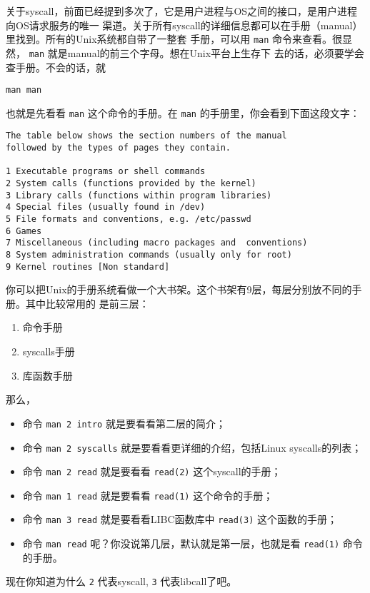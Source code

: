 \documentclass{wx672ctexart}
\newcommand\mpic[1]{%
  \marginpar{\texttt{[image: thumbnails/\#1]}}}
\begin{document}
\mpic{pg_0037}关于syscall，前面已经提到多次了，它是用户进程与OS之间的接口，是用户进程向OS请求服务的唯一
渠道。关于所有syscall的详细信息都可以在手册（manual）里找到。所有的Unix系统都自带了一整套
手册，可以用 \texttt{man} 命令来查看。很显然， \texttt{man} 就是manual的前三个字母。想在Unix平台上生存下
去的话，必须要学会查手册。不会的话，就
\begin{verbatim}
man man
\end{verbatim}
也就是先看看 \texttt{man} 这个命令的手册。在 \texttt{man} 的手册里，你会看到下面这段文字：

\begin{verbatim}
The table below shows the section numbers of the manual
followed by the types of pages they contain.

1 Executable programs or shell commands
2 System calls (functions provided by the kernel)
3 Library calls (functions within program libraries)
4 Special files (usually found in /dev)
5 File formats and conventions, e.g. /etc/passwd
6 Games
7 Miscellaneous (including macro packages and  conventions)
8 System administration commands (usually only for root)
9 Kernel routines [Non standard]
\end{verbatim}

你可以把Unix的手册系统看做一个大书架。这个书架有9层，每层分别放不同的手册。其中比较常用的
是前三层：
\begin{enumerate}
\item 命令手册
\item syscalls手册
\item 库函数手册
\end{enumerate}

那么，
\begin{itemize}
\item 命令 \texttt{man 2 intro} 就是要看看第二层的简介；
\item 命令 \texttt{man 2 syscalls} 就是要看看更详细的介绍，包括Linux syscalls的列表；
\item 命令 \texttt{man 2 read} 就是要看看 \texttt{read(2)} 这个syscall的手册；
\item 命令 \texttt{man 1 read} 就是要看看 \texttt{read(1)} 这个命令的手册；
\item 命令 \texttt{man 3 read} 就是要看看LIBC函数库中 \texttt{read(3)} 这个函数的手册；
\item 命令 \texttt{man read} 呢？你没说第几层，默认就是第一层，也就是看 \texttt{read(1)} 命令的手册。
\end{itemize}
现在你知道为什么 \texttt{2} 代表syscall, \texttt{3} 代表libcall了吧。
\end{document}
